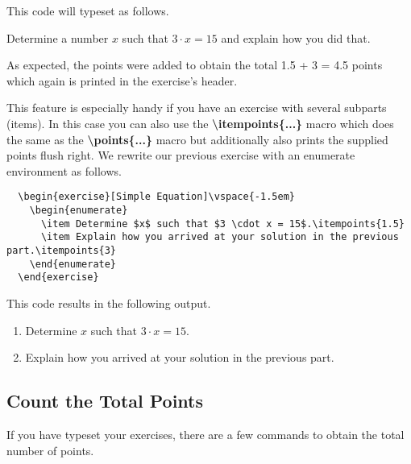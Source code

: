 \documentclass[
  twocolumn,%
  fontsize=9pt,%
  DIV=calc,%
  numbers=noendperiod%
]{scrartcl}
\begin{document}
\noindent This code will typeset as follows.

\begin{exercise}
  Determine a number $x$ such that $3 \cdot x = 15$ and explain how you did that.
\end{exercise}

\noindent As expected, the points were added to obtain the total 1.5 + 3 = 4.5 points which again is printed in the exercise's header. 

This feature is especially handy if you have an exercise with several subparts (items). In this case you can also use the \textcolor{NavyBlue}{\ttfamily\bfseries \textbackslash itempoints\{...\}} macro which does the same as the \textcolor{NavyBlue}{\ttfamily\bfseries \textbackslash points\{...\}} macro but additionally also prints the supplied points flush right. We rewrite our previous exercise with an enumerate environment as follows.

\begin{lstlisting}
  \begin{exercise}[Simple Equation]\vspace{-1.5em}
    \begin{enumerate}
      \item Determine $x$ such that $3 \cdot x = 15$.\itempoints{1.5}
      \item Explain how you arrived at your solution in the previous part.\itempoints{3}
    \end{enumerate}
  \end{exercise} 
\end{lstlisting}

\noindent This code results in the following output.
\begin{exercise}\vspace{-1.5em}
  \begin{enumerate}
    \item Determine $x$ such that $3 \cdot x = 15$.
    \item Explain how you arrived at your solution in the previous part.
  \end{enumerate}
\end{exercise}

\subsection{Count the Total Points}
If you have typeset your exercises, there are a few commands to obtain the total number of points.
\end{document}
